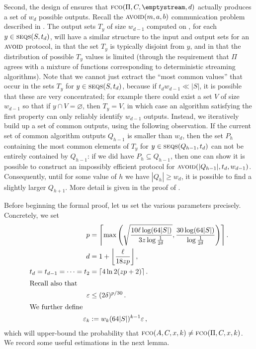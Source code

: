 \documentclass[10pt,a4paper]{article}
\theoremstyle{definition}
\theoremstyle{remark}
\newcommand{\ceil}[1]{{\left\lceil{#1}\right\rceil}}
\newcommand{\floor}[1]{{\left\lfloor{#1}\right\rfloor}}
\let\epsilon\varepsilon
\renewcommand{\emptyset}{\varnothing}
\newcommand{\avoid}{\textsc{avoid}\xspace}
\newcommand{\fco}{\textsc{fco}\xspace}
\newcommand{\rl}{\mathbf{\ell}}             %
\newcommand{\SSD}[2]{\textsc{seqs}(#1,#2)}  %
\begin{document}
\begin{itemize}
\begin{itemize}
Second, the design of  ensures that
$\fco(\Pi,C,\emptystream,d)$
actually produces a set of $w_d$ possible outputs. Recall the $\avoid(m,a,b)$
communication problem described in . The output
sets $T_y$ of size $w_{d-1}$ computed on , for
each $y \in \SSD{S}{t_d}$, will have a similar structure to the input
and output sets for an $\avoid$ protocol, in that the set $T_y$ is typically
disjoint from $y$, and in that the distribution of possible $T_y$ values is
limited (through the requirement that $\Pi$ agrees with a mixture of functions
corresponding to deterministic streaming algorithms). Note that we
cannot just extract the ``most common values'' that occur in the sets $T_y$
for $y \in \SSD{S}{t_d}$, because if $t_d w_{d-1} \ll |S|$, it is
possible that these are very concentrated; for example there could exist a set
$V$ of size $w_{d-1}$ so that if $y \cap V = \emptyset$, then $T_y = V$, in
which case an algorithm satisfying the first property can only reliably
identify $w_{d-1}$ outputs. Instead, we iteratively build up a set of common
outputs, using the following observation. If the current set of common
algorithm outputs $Q_{h-1}$ is smaller than $w_d$, then the set $P_h$
containing the most common elements of $T_y$ for $y \in
\SSD{Q_{h-1}}{t_d}$ can not be entirely contained by $Q_{h-1}$: if we
did have $P_h \subseteq Q_{h-1}$, then one can show it is possible to
construct an impossibly efficient protocol for
$\avoid(|Q_{h-1}|,t_d,w_{d-1})$. Consequently, until for some value of $h$ we
have $|Q_{h}| \ge w_d$, it is possible to find a slightly larger $Q_{h+1}$.
More detail is given in the proof of .

\medskip Before beginning the formal proof, let us set the various parameters
precisely. Concretely, we set
\begin{align}
  p &= \ceil{\max\left(\sqrt{\frac{10 \rl \log (64|S|)}{3 z \log \frac{1}{2\delta}}}, 
    \frac{30 \log(64|S|)}{\log \frac{1}{2\delta}}\right) } \,.  \label{eq:pd-p-choice} \\
  d &= 1 + \floor{\frac{\rl}{18 zp}} \,, \label{eq:d-def} \\
  t_d = t_{d-1} = \cdots = t_2 &= \ceil{4 \ln 2 (zp+2)} \,. \\
\intertext{Recall also that}
  \epsilon &\le (2\delta)^{p/30} \,. \\
\intertext{We further define}
  \epsilon_k &:= w_k (64 |S|)^{k-1} \epsilon \,, \label{eq:eps-k-def}
\end{align}
which will upper-bound the probability that $\fco(A, C, x, k) \ne \fco(\Pi, C, x, k)$.
%
We record some useful estimations in the next lemma.


\end{itemize}
\end{itemize}
\end{document}
